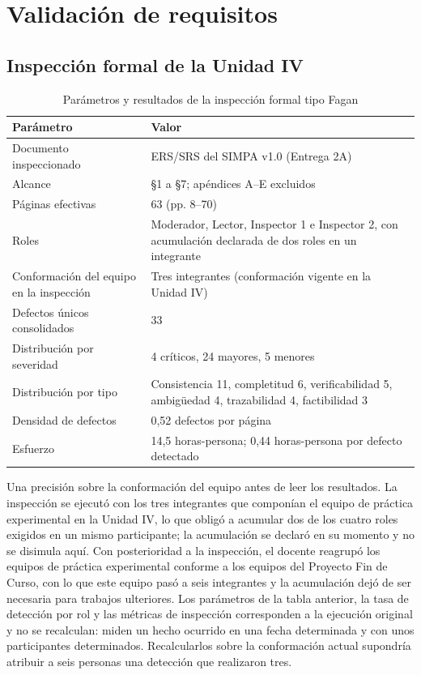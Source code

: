 \section{Validación de requisitos}
\label{sec:validacion}

\subsection{Inspección formal de la Unidad IV}

\begin{table}[H]
\centering\footnotesize
\caption{Parámetros y resultados de la inspección formal tipo Fagan}
\label{tab:inspeccion}
\begin{tabular}{|L{6.4cm}|L{8.6cm}|}
\hline
{}\textbf{Parámetro} & \textbf{Valor}\\ \hline
Documento inspeccionado & ERS/SRS del SIMPA v1.0 (Entrega 2A)\\ \hline
Alcance & \S1 a \S7; apéndices A--E excluidos\\ \hline
Páginas efectivas & 63 (pp. 8--70)\\ \hline
Roles & Moderador, Lector, Inspector 1 e Inspector 2, con acumulación declarada de dos roles en un integrante\\ \hline
Conformación del equipo en la inspección & Tres integrantes (conformación vigente en la Unidad IV)\\ \hline
Defectos únicos consolidados & 33\\ \hline
Distribución por severidad & 4 críticos, 24 mayores, 5 menores\\ \hline
Distribución por tipo & Consistencia 11, completitud 6, verificabilidad 5, ambigüedad 4, trazabilidad 4, factibilidad 3\\ \hline
Densidad de defectos & 0,52 defectos por página\\ \hline
Esfuerzo & 14,5 horas-persona; 0,44 horas-persona por defecto detectado\\ \hline
\end{tabular}
\end{table}

\noindent
Una precisión sobre la conformación del equipo antes de leer los resultados. La inspección se ejecutó
con los tres integrantes que componían el equipo de práctica experimental en la Unidad IV, lo que
obligó a acumular dos de los cuatro roles exigidos en un mismo participante; la acumulación se
declaró en su momento y no se disimula aquí. Con posterioridad a la inspección, el docente reagrupó
los equipos de práctica experimental conforme a los equipos del Proyecto Fin de Curso, con lo que
este equipo pasó a seis integrantes y la acumulación dejó de ser necesaria para trabajos ulteriores.
Los parámetros de la tabla anterior, la tasa de detección por rol y las métricas de inspección
corresponden a la ejecución original y no se recalculan: miden un hecho ocurrido en una fecha
determinada y con unos participantes determinados. Recalcularlos sobre la conformación actual
supondría atribuir a seis personas una detección que realizaron tres.

